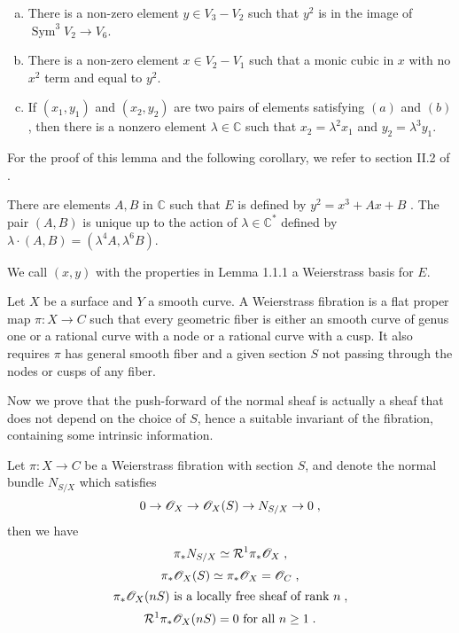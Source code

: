 \begin{lemma} \hfill
\begin{enumerate}[(a)]
\item There is a non-zero element $y\in V_3-V_2$ such that $y^2$ is in the image of $\operatorname{Sym}^3V_2\rightarrow V_6$.
\item There is a non-zero element $x\in V_2-V_1$ such that a monic cubic in $x$ with no $x^2$ term and equal to $y^2$.
\item  If $(x_1,y_1)$ and $(x_2,y_2)$ are two pairs of elements satisfying $(a)$ and $(b)$, then there is a nonzero element $\lambda\in\mathbb{C}$ such that $x_2=\lambda^2x_1$ and $y_2=\lambda^3y_1$.
\end{enumerate}
\end{lemma}
For the proof of this lemma and the following corollary, we refer to section II.2 of \cite{miranda1989basic}.
\begin{corollary}
There are elements $A,B$ in $\mathbb{C}$  such that $E$ is defined by $y^2=x^3+Ax+B$ . The pair $(A,B)$ is unique up to the action of $\lambda\in \mathbb{C}^*$ defined by $\lambda\cdot(A,B)=(\lambda^4 A,\lambda^6 B)$.
\end{corollary}
\begin{definition}
We call $(x,y)$ with the properties in Lemma 1.1.1 a Weierstrass basis for $E$.
\end{definition} 
\begin{definition}
Let $X$ be a surface and $Y$ a smooth curve. A Weierstrass fibration is a flat proper map $\pi\colon X\rightarrow C$ such that every geometric fiber is either an smooth curve of genus one or a rational curve with a node or a rational curve with a cusp. It also requires $\pi$ has general smooth fiber and a given section $S$ not passing through the nodes or cusps of any fiber.
\end{definition}
Now we prove that the push-forward of the normal sheaf is actually a sheaf that does not depend on the choice of $S$, hence a suitable invariant of the fibration, containing some intrinsic information.
\begin{proposition}
Let $\pi\colon X\rightarrow C$ be a Weierstrass fibration with section $S$, and denote the normal bundle $N_{S/X}$ which satisfies
\[0\rightarrow \mathscr{O}_X\rightarrow \mathscr{O}_X(S)\rightarrow N_{S/X}\rightarrow 0\; ,\]
then we have
\[\pi_*N_{S/X}\simeq \mathcal{R}^1\pi_*\mathscr{O}_X\; ,\]
\[\pi_*\mathscr{O}_X(S)\simeq \pi_*\mathscr{O}_X=\mathscr{O}_C\; ,\]
\[\pi_*\mathscr{O}_X(nS)\textrm{ is a locally free sheaf of rank }n\; ,\]
\[\mathcal{R}^1\pi_*\mathscr{O}_X(nS)=0\textrm{ for all }n\geq 1\; .\]
\end{proposition}
